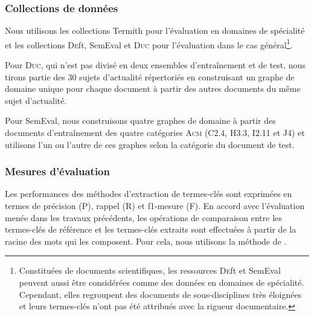      \subsubsection{Collections de données}
      \label{subsubsec:main-domain_specific_keyphrase_annotation-supervised_automatic_keyphrase_annotation-evaluation-evaluation_data}
        Nous utilisons les collections Termith pour l'évaluation en domaines de
        spécialité et les collections \textsc{De}ft, SemEval et \textsc{Duc}
        pour l'évaluation dans le cas général\footnote{Constituées de documents
        scientifiques, les ressources \textsc{De}ft et SemEval peuvent aussi
        être considérées comme des données en domaines de spécialité.
        Cependant, elles regroupent des documents de sous-disciplines très
        éloignées et leurs termes-clés n'ont pas été attribués avec la rigueur
        documentaire.}.
        
        Pour \textsc{Duc}, qui n'est pas divisé en deux ensembles d'entraînement
        et de test, nous tirons partie des 30 sujets d'actualité répertoriés en
        construisant un graphe \og{}de domaine\fg{} unique pour chaque document
        à partir des autres documents du même sujet d'actualité.
        
        Pour SemEval, nous construisons quatre graphes de domaine à partir des
        documents d'entraînement des quatre catégories \textsc{Acm} (C2.4, H3.3,
        I2.11 et J4) et utilisons l'un ou l'autre de ces graphes selon la
        catégorie du document de test. 
      
      \subsubsection{Mesures d'évaluation}
      \label{subsubsec:main-domain_specific_keyphrase_annotation-supervised_automatic_keyphrase_annotation-evaluation-evaluation_measures}
        Les performances des méthodes d'extraction de termes-clés sont exprimées
        en termes de précision (P), rappel (R) et f1-mesure (F). En
        accord avec l'évaluation menée dans les travaux précédents, les
        opérations de comparaison entre les termes-clés de référence et les
        termes-clés extraits sont effectuées à partir de la racine des mots qui
        les composent. Pour cela, nous utilisons la méthode de
        .

